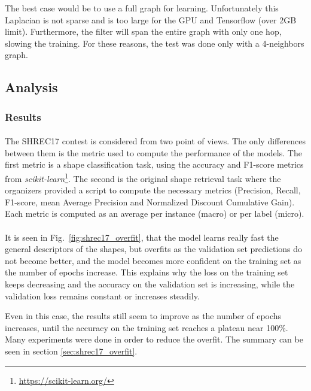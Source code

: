\documentclass[11pt]{report}
\begin{document}
The best case would be to use a full graph for learning. Unfortunately this Laplacian is not sparse and is too large for the GPU and Tensorflow (over 2GB limit). Furthermore, the filter will span the entire graph with only one hop, slowing the training. For these reasons, the test was done only with a 4-neighbors graph.
\subsection{Analysis}\label{sec:shrec_anal}

\subsubsection*{Results}
\paragraph*{}
The SHREC17 contest is considered from two point of views. The only differences between them is the metric used to compute the performance of the models. The first metric is a shape classification task, using the accuracy and F1-score metrics from \emph{scikit-learn}\footnote{\url{https://scikit-learn.org/}}. The second is the original shape retrieval task where the organizers provided a script to compute the necessary metrics (Precision, Recall, F1-score, mean Average Precision and Normalized Discount Cumulative Gain). Each metric is computed as an average per instance (macro) or per label (micro).

\paragraph*{}
It is seen in Fig.~\ref{fig:shrec17_overfit}, that the model learns really fast the general descriptors of the shapes, but overfits as the validation set predictions do not become better, and the model becomes more confident on the training set as the number of epochs increase. This explains why the loss on the training set keeps decreasing and the accuracy on the validation set is increasing, while the validation loss remains constant or increases steadily.

Even in this case, the results still seem to improve as the number of epochs increases, until the accuracy on the training set reaches a plateau near 100\%. Many experiments were done in order to reduce the overfit. The summary can be seen in section \ref{sec:shrec17_overfit}.
\end{document}
